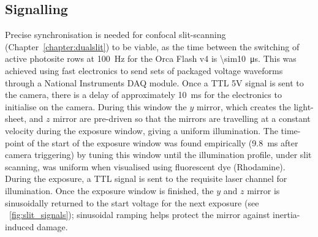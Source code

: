 

\subsection{Signalling} %

Precise synchronisation is needed for confocal slit-scanning (Chapter~\ref{chapter:dualslit}) to be viable, as the time between the switching of active \gls{photosite} rows at \SI{100}{\hertz} for the Orca Flash v4 is \SI{\sim10}{\micro\second}. %
This was achieved using fast electronics to send sets of packaged voltage waveforms through a National Instruments \gls{DAQ} module.
Once a \gls{TTL} 5V signal is sent to the camera, there is a delay of approximately \SI{10}{\milli\second} for the electronics to initialise on the camera.
During this window the \(y\) mirror, which creates the \gls{light-sheet}, and \(z\) mirror are pre-driven so that the mirrors are travelling at a constant velocity during the exposure window, giving a uniform illumination.
The time-point of the start of the exposure window was found empirically (\SI{9.8}{\milli\second} after camera triggering) by tuning this window until the illumination profile, under slit scanning, was uniform when visualised using fluorescent dye (Rhodamine).
During the exposure, a \gls{TTL} signal is sent to the requisite laser channel for illumination.
Once the exposure window is finished, the \(y\) and \(z\) mirror is sinusoidally returned to the start voltage for the next exposure (see \figurename~\ref{fig:slit_signals}); sinusoidal ramping helps protect the mirror against inertia-induced damage.

